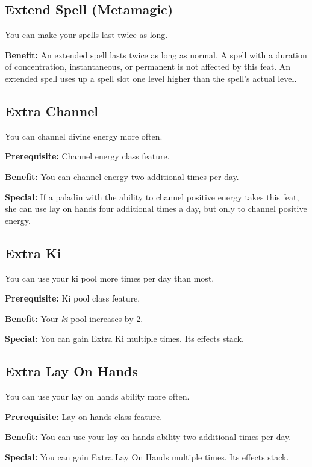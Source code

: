 \subsection{Extend Spell (Metamagic)}

				
You can make your spells last twice as long.
				
\textbf{Benefit:} An extended spell lasts twice as long as normal. A spell with a duration of concentration, instantaneous, or permanent is not affected by this feat. An extended spell uses up a spell slot one level higher than the spell's actual level.
				
\subsection{Extra Channel}

				
You can channel divine energy more often.
				
\textbf{Prerequisite:} Channel energy class feature.
				
\textbf{Benefit:} You can channel energy two additional times per day.
				
\textbf{Special:} If a paladin with the ability to channel positive energy takes this feat, she can use lay on hands four additional times a day, but only to channel positive energy.
				
\subsection{Extra Ki}

				
You can use your ki pool more times per day than most.
				
\textbf{Prerequisite:} Ki pool class feature.
				
\textbf{Benefit:} Your \textit{ki }pool increases by 2. 
				
\textbf{Special:} You can gain Extra Ki multiple times. Its effects stack.
				
\subsection{Extra Lay On Hands}

				
You can use your lay on hands ability more often.
				
\textbf{Prerequisite:} Lay on hands class feature.
				
\textbf{Benefit:} You can use your lay on hands ability two additional times per day. 
				
\textbf{Special:} You can gain Extra Lay On Hands multiple times. Its effects stack.
				
